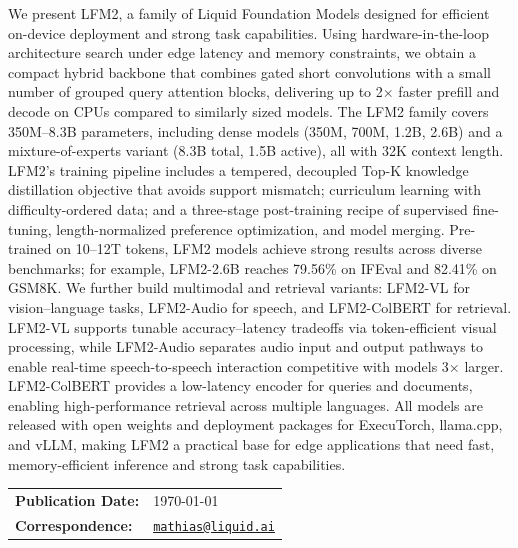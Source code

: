 \documentclass{article}
\makeatletter
\newcommand{\reportdate}{\today} %
\newcommand{\correspondingemail}{mathias@liquid.ai}
\makeatother
\begin{document}
\begin{abstractbox}
We present LFM2, a family of Liquid Foundation Models designed for efficient on-device deployment and strong task capabilities. Using hardware-in-the-loop architecture search under edge latency and memory constraints, we obtain a compact hybrid backbone that combines gated short convolutions with a small number of grouped query attention blocks, delivering up to 2$\times$ faster prefill and decode on CPUs compared to similarly sized models. The LFM2 family covers 350M–8.3B parameters, including dense models (350M, 700M, 1.2B, 2.6B) and a mixture-of-experts variant (8.3B total, 1.5B active), all with 32K context length. LFM2’s training pipeline includes a tempered, decoupled Top-K knowledge distillation objective that avoids support mismatch; curriculum learning with difficulty-ordered data; and a three-stage post-training recipe of supervised fine-tuning, length-normalized preference optimization, and model merging. Pre-trained on 10–12T tokens, LFM2 models achieve strong results across diverse benchmarks; for example, LFM2-2.6B reaches 79.56\% on IFEval and 82.41\% on GSM8K. We further build multimodal and retrieval variants: LFM2-VL for vision–language tasks, LFM2-Audio for speech, and LFM2-ColBERT for retrieval. LFM2-VL supports tunable accuracy–latency tradeoffs via token-efficient visual processing, while LFM2-Audio separates audio input and output pathways to enable real-time speech-to-speech interaction competitive with models 3$\times$ larger. LFM2-ColBERT provides a low-latency encoder for queries and documents, enabling high-performance retrieval across multiple languages. All models are released with open weights and deployment packages for ExecuTorch, llama.cpp, and vLLM, making LFM2 a practical base for edge applications that need fast, memory-efficient inference and strong task capabilities.






\vspace{0.7\baselineskip} %
{\footnotesize
\setlength{\tabcolsep}{3pt}%
\begin{tabular}{@{}l l@{}}
\textbf{Publication Date:} & \reportdate \\
\textbf{Correspondence:}   & \href{mailto:\correspondingemail}{\texttt{\correspondingemail}}
\end{tabular}
}
\end{abstractbox}
\end{document}
